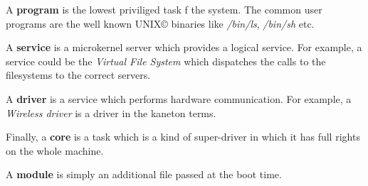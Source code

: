 A \textbf{program} is the lowest priviliged task f the system. The common
user programs are the well known UNIX{\copyright} binaries like
\textit{/bin/ls}, \textit{/bin/sh} etc.

A \textbf{service} is a microkernel server which provides a logical
service. For example, a service could be the \textit{Virtual File System}
which dispatches the calls to the filesystems to the correct servers.

A \textbf{driver} is a service which performs hardware communication.
For example, a \textit{Wireless driver} is a driver in the kaneton terms.

Finally, a \textbf{core} is a task which is a kind of super-driver in which
it has full rights on the whole machine.

A \textbf{module} is simply an additional file passed at the boot time.
